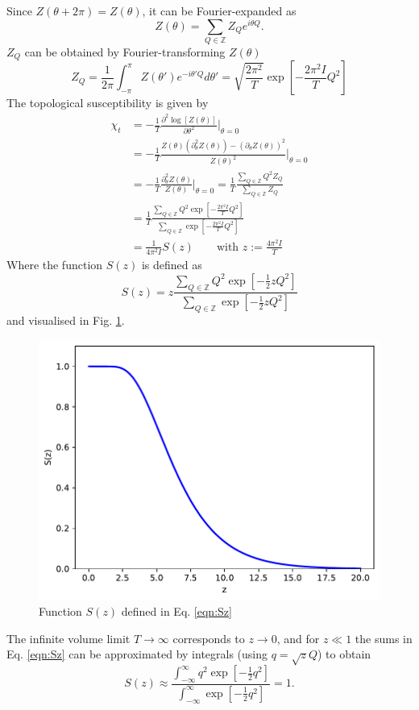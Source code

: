 \documentclass[11pt]{article}
\begin{document}
Since $Z(\theta+2\pi)=Z(\theta)$, it can be Fourier-expanded as
\begin{equation}
  Z(\theta)=\sum_{Q\in\mathbb{Z}} Z_Q e^{i\theta Q}.
\end{equation}
$Z_Q$ can be obtained by Fourier-transforming $Z(\theta)$
\begin{equation}
  Z_Q = \frac{1}{2\pi}\int_{-\pi}^{\pi} Z(\theta')e^{-i\theta'Q}d\theta'
  = \sqrt{\frac{2\pi^2}{T}}\exp\left[-\frac{2\pi^2I}{T}Q^2\right]
\end{equation}
The topological susceptibility is given by
\begin{equation}
  \begin{aligned}
    \chi_t &= -\frac{1}{T}\frac{\partial^2\log[Z(\theta)]}{\partial\theta^2}\Big\vert_{\theta=0}\\
    &= -\frac{1}{T}\frac{Z(\theta)(\partial^2_\theta Z(\theta))-(\partial_\theta Z(\theta))^2}{Z(\theta)^2}\Big\vert_{\theta=0}\\
    &= -\frac{1}{T}\frac{\partial^2_\theta Z(\theta)}{Z(\theta)}\Big\vert_{\theta=0}
    = \frac{1}{T}\frac{\sum_{Q\in\mathbb{Z}} Q^2 Z_Q}{\sum_{Q\in\mathbb{Z}}Z_Q}\\
    &= \frac{1}{T}\frac{\sum_{Q\in\mathbb{Z}} Q^2 \exp\left[-\frac{2\pi^2I}{T}Q^2\right]}{\sum_{Q\in\mathbb{Z}}\exp\left[-\frac{2\pi^2I}{T}Q^2\right]}\\
    &= \frac{1}{4\pi^2 I} S(z)\qquad\text{with $z:=\frac{4\pi^2 I}{T}$}
      \end{aligned}
\end{equation}
Where the function $S(z)$ is defined as
\begin{equation}
  S(z) = z \frac{\sum_{Q\in\mathbb{Z}}Q^2 \exp\left[-\frac{1}{2}zQ^2\right]}{\sum_{Q\in\mathbb{Z}}\exp\left[-\frac{1}{2}zQ^2\right]}\label{eqn:Sz}
\end{equation}
and visualised in Fig. \ref{fig:Splot}.
\begin{figure}
  \begin{center}
    \includegraphics[width=0.5\linewidth]{S.pdf}
    \caption{Function $S(z)$ defined in Eq. \eqref{eqn:Sz}}
    \label{fig:Splot}
  \end{center}
\end{figure}
The infinite volume limit $T\rightarrow\infty$ corresponds to $z\rightarrow 0$, and for $z\ll 1$ the sums in Eq. \eqref{eqn:Sz} can be approximated by integrals (using $q=\sqrt{z}Q$) to obtain
\begin{equation}
  S(z) \approx \frac{\int_{-\infty}^\infty q^2 \exp\left[-\frac{1}{2}q^2\right]}{\int_{-\infty}^\infty \exp\left[-\frac{1}{2}q^2\right]}=1.
\end{equation}


\end{document}
